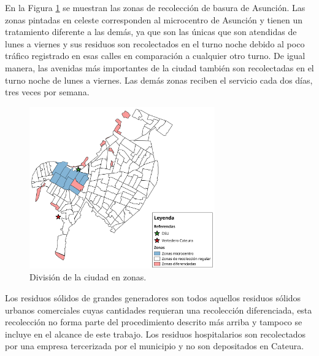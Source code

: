 En la Figura \ref{fig:zonasRecoleccion} se muestran las zonas de recolección de basura de Asunción. Las zonas pintadas en celeste corresponden al microcentro de Asunción y tienen un tratamiento diferente a las demás, ya que son las únicas que son atendidas de lunes a viernes y sus residuos son recolectados en el turno noche debido al poco tráfico registrado en esas calles en comparación a cualquier otro turno. De igual manera, las avenidas más importantes de la ciudad también son recolectadas en el turno noche de lunes a viernes. Las demás zonas reciben el servicio cada dos días, tres veces por semana.

\begin{figure}[H]
    \centering
    \includegraphics[width=8cm]{Recoleccion-ZONAS_CUADRANTES.png}
    \caption{División de la ciudad en zonas.}
    \label{fig:zonasRecoleccion}
\end{figure}

Los residuos sólidos de grandes generadores son todos aquellos residuos sólidos urbanos comerciales cuyas cantidades requieran una recolección diferenciada, esta recolección no forma parte del procedimiento descrito más arriba y tampoco se incluye en el alcance de este trabajo. Los residuos hospitalarios son recolectados por una empresa tercerizada por el municipio y no son depositados en Cateura.


